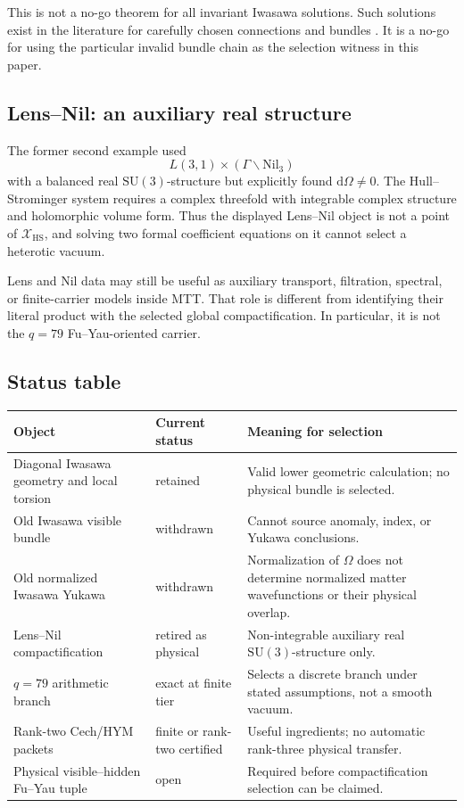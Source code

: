 \documentclass[11pt]{article}
\newcommand{\cX}{\mathcal{X}}
\newcommand{\dd}{\mathrm{d}}
\newcommand{\HS}{\mathrm{HS}}
\newcommand{\SU}{\mathrm{SU}}
\numberwithin{equation}{section}
\theoremstyle{definition}
\theoremstyle{plain}
\theoremstyle{remark}
\begin{document}
This is not a no-go theorem for all invariant Iwasawa solutions.  Such
solutions exist in the literature for carefully chosen connections and
bundles \cite{FeiYau2015,OtalUgarteVillacampa2016}.  It is a no-go for using
the particular invalid bundle chain as the selection witness in this paper.

\subsection{Lens--Nil: an auxiliary real structure}

The former second example used
\[
L(3,1)\times(\Gamma\backslash\mathrm{Nil}_3)
\]
with a balanced real \(\SU(3)\)-structure but explicitly found
\(\dd\Omega\neq0\).  The Hull--Strominger system requires a complex
threefold with integrable complex structure and holomorphic volume form.
Thus the displayed Lens--Nil object is not a point of \(\cX_{\HS}\), and
solving two formal coefficient equations on it cannot select a heterotic
vacuum.

Lens and Nil data may still be useful as auxiliary transport, filtration,
spectral, or finite-carrier models inside MTT.  That role is different from
identifying their literal product with the selected global compactification.
In particular, it is not the \(q=79\) Fu--Yau-oriented carrier.

\subsection{Status table}

\begin{center}
\small
\begin{tabular}{p{}p{}p{}}
\toprule
Object & Current status & Meaning for selection\\
\midrule
Diagonal Iwasawa geometry and local torsion & retained &
Valid lower geometric calculation; no physical bundle is selected.\\
Old Iwasawa visible bundle & withdrawn &
Cannot source anomaly, index, or Yukawa conclusions.\\
Old normalized Iwasawa Yukawa & withdrawn &
Normalization of \(\Omega\) does not determine normalized matter
wavefunctions or their physical overlap.\\
Lens--Nil compactification & retired as physical &
Non-integrable auxiliary real \(\SU(3)\)-structure only.\\
\(q=79\) arithmetic branch & exact at finite tier &
Selects a discrete branch under stated assumptions, not a smooth vacuum.\\
Rank-two Cech/HYM packets & finite or rank-two certified &
Useful ingredients; no automatic rank-three physical transfer.\\
Physical visible--hidden Fu--Yau tuple & open &
Required before compactification selection can be claimed.\\
\bottomrule
\end{tabular}
\end{center}
\end{document}
